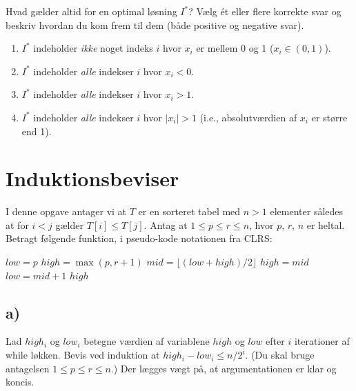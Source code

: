 \documentclass{article}
\theoremstyle{definition}
\begin{document}
Hvad gælder altid for en optimal løsning $I^*$? Vælg ét eller flere korrekte svar og beskriv hvordan du kom frem til dem (både positive og negative svar).

\begin{enumerate}
    \item $I^*$ indeholder \textit{ikke} noget indeks $i$ hvor $x_i$ er mellem 0 og 1 ($x_i \in (0,1)$).
    \item $I^*$ indeholder \textit{alle} indekser $i$ hvor $x_i < 0$.
    \item $I^*$ indeholder \textit{alle} indekser $i$ hvor $x_i > 1$.
    \item $I^*$ indeholder \textit{alle} indekser $i$ hvor $|x_i| > 1$ (i.e., absolutværdien af $x_i$ er større end 1).
\end{enumerate}

\section{Induktionsbeviser}

I denne opgave antager vi at $T$ er en sorteret tabel med $n > 1$ elementer således at for $i < j$ gælder $T[i] \leq T[j]$. Antag at $1 \leq p \leq r \leq n$, hvor $p$, $r$, $n$ er heltal. Betragt følgende funktion, i pseudo-kode notationen fra CLRS:

\begin{algorithmic}[1]
    \State $low = p$
    \State $high = \max(p,r+1)$
        \State $mid = \lfloor(low + high)/2\rfloor$
            \State $high = mid$
        \Else
            \State $low = mid + 1$
        \EndIf
    \EndWhile
    \State \Return $high$
\EndFunction
\end{algorithmic}

\subsection*{a)} Lad $high_i$ og $low_i$ betegne værdien af variablene $high$ og $low$ efter $i$ iterationer af while løkken. Bevis ved induktion at $high_i - low_i \leq n/2^i$. (Du skal bruge antagelsen $1 \leq p \leq r \leq n$.) Der lægges vægt på, at argumentationen er klar og koncis.
\end{document}
